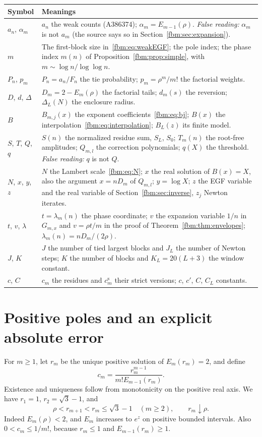 \documentclass[11pt]{article}
\theoremstyle{remark}\newtheorem{remark}[theorem]{Remark}
\begin{document}
\renewcommand{\arraystretch}{1.1}
\noindent\begin{tabular}{@{}>{\raggedright\arraybackslash}p{0.8in}>{\raggedright\arraybackslash}p{5.4in}@{}}
\toprule
Symbol & Meanings\\
\midrule
$a_n$, $\alpha_m$ & $a_n$ the weak counts (A386374); $\alpha_m=E_{m-1}(\rho)$. \emph{False reading:} $\alpha_m$ is not $a_m$ (the source says so in Section~\ref{fbm:sec:expansion}).\\
$m$ & The first-block size in~\eqref{fbm:eq:weakEGF}; the pole index; the phase index $m(n)$ of Proposition~\ref{fbm:prop:simple}, with $m\sim\log n/\log\log n$.\\
$P_n$, $p_m$ & $P_n=a_n/F_n$ the tie probability; $p_m=\rho^m/m!$ the factorial weights.\\
$D$, $d$, $\Delta$ & $D_m=2-E_m(\rho)$ the factorial tails; $d_m(s)$ the reversion; $\Delta_L(N)$ the enclosure radius.\\
$B$ & $B_{m,j}(x)$ the exponent coefficients~\eqref{fbm:eq:bj}; $B(x)$ the interpolation~\eqref{fbm:eq:interpolation}; $B_L(z)$ its finite model.\\
$S$, $T$, $Q$, $q$ & $S(n)$ the normalized residue sum, $S_L$, $S_0$; $T_m(n)$ the root-free amplitudes; $Q_{m,l}$ the correction polynomials; $q(X)$ the threshold. \emph{False reading:} $q$ is not $Q$.\\
$N$, $x$, $y$, $z$ & $N$ the Lambert scale~\eqref{fbm:eq:N}; $x$ the real solution of $B(x)=X$, also the argument $x=nD_m$ of $Q_{m,l}$; $y=\log X$; $z$ the EGF variable and the real variable of Section~\ref{fbm:sec:inverse}, $z_j$ Newton iterates.\\
$t$, $v$, $\lambda$ & $t=\lambda_m(n)$ the phase coordinate; $v$ the expansion variable $1/n$ in $G_{m,x}$ and $v=\rho t/m$ in the proof of Theorem~\ref{fbm:thm:envelopes}; $\lambda_m(n)=nD_m/(2\rho)$.\\
$J$, $K$ & $J$ the number of tied largest blocks and $J_L$ the number of Newton steps; $K$ the number of blocks and $K_L=20(L+3)$ the window constant.\\
$c$, $C$ & $c_m$ the residues and $c^{\mathrm s}_m$ their strict versions; $c$, $c'$, $C$, $C_L$ constants.\\
\bottomrule
\end{tabular}
\endgroup

\section{Positive poles and an explicit absolute error}\label{fbm:sec:poles}
For $m\geq1$, let $r_m$ be the unique positive solution of $E_m(r_m)=2$, and define
\begin{equation}\label{fbm:eq:residue}
 c_m=\frac{r_m^{m-1}}{m!E_{m-1}(r_m)}.
\end{equation}
Existence and uniqueness follow from monotonicity on the positive real axis. We have $r_1=1$, $r_2=\sqrt3-1$, and
\[
 \rho<r_{m+1}<r_m\leq\sqrt3-1\quad(m\geq2),\qquad r_m\downarrow\rho.
\]
Indeed $E_m(\rho)<2$, and $E_m$ increases to $e^z$ on positive bounded intervals. Also $0<c_m\leq1/m!$, because $r_m\leq1$ and $E_{m-1}(r_m)\geq1$.
\end{document}
